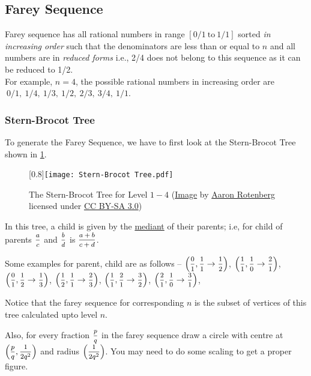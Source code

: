 \recalctypearea
\subsection{Farey Sequence}{\label{pp:fareysequence}}
Farey sequence has all rational numbers in range $[0/1\ \text{to}\ 1/1]$ sorted \emph{in increasing order} such that the denominators are less than or equal to $n$ and all numbers are in \emph{reduced forms} i.e., 2/4 does not belong to this sequence as it can be reduced to 1/2.\\
For example, $n=4$, the possible rational numbers in increasing order are $\ 0/1,\ 1/4,\ 1/3,\ 1/2,\ 2/3,\ 3/4,\ 1/1$.
\vspace{-1em}
\subsubsection*{Stern-Brocot Tree}
\vspace{-0.7em}
To generate the Farey Sequence, we have to first look at the {Stern-Brocot Tree} shown in \ref{fig:sternbrocottree}.
\begin{figure}[H]
	\centering
	\scalebox{1}[0.8]{\texttt{[image: Stern-Brocot Tree.pdf]}}
	\caption{The Stern-Brocot Tree for Level $1-4$ (\href{https://commons.wikimedia.org/wiki/File:SternBrocotTree.svg}{Image} by \href{https://commons.wikimedia.org/wiki/User:Aaron_Rotenberg}{Aaron Rotenberg} licensed under \href{https://creativecommons.org/licenses/by-sa/3.0/}{CC BY-SA 3.0})}
	\label{fig:sternbrocottree}
\end{figure}
In this tree, a child is given by the \href{https://en.wikipedia.org/wiki/Mediant_(mathematics)}{mediant} of their parents; i.e, for child of parents $\mfrac{a}{c}$ and $\mfrac{b}{d}$ is $\mfrac{a+b}{c+d}$.

Some examples for parent, child are as follows -- $\left(\mfrac{0}{1}, \mfrac{1}{1} \rightarrow \mfrac{1}{2}\right)$, $\left(\mfrac{1}{1}, \mfrac{1}{0} \rightarrow \mfrac{2}{1}\right)$, $\left(\mfrac{0}{1}, \mfrac{1}{2} \rightarrow \mfrac{1}{3}\right)$, $\left(\mfrac{1}{2}, \mfrac{1}{1} \rightarrow \mfrac{2}{3}\right)$, $\left(\mfrac{1}{1}, \mfrac{2}{1} \rightarrow \mfrac{3}{2}\right)$, $\left(\mfrac{2}{1}, \mfrac{1}{0} \rightarrow \mfrac{3}{1}\right)$,

Notice that the farey sequence for corresponding $n$ is the subset of vertices of this tree calculated upto level $n$.

Also, for every fraction $\mfrac{p}{q}$ in the farey sequence draw a circle with centre at $\left(\mfrac{p}{q}, \mfrac{1}{2q^2}\right)$ and radius $\left(\mfrac{1}{2q^2}\right)$. You may need to do some scaling to get a proper figure.

